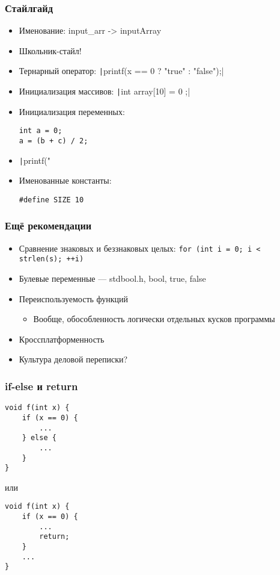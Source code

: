\documentclass{../../slides-style}
\begin{document}
    
    \begin{frame}[plain]
        \titlepage
    \end{frame}
    
    \begin{frame}[fragile]
        \frametitle{Стайлгайд}
        \begin{itemize}
            \item Именование: input\_arr -> inputArray
            \item Школьник-стайл!
            \item Тернарный оператор: \texttt|printf(x == 0 ? "true" :  "false");|
            \item Инициализация массивов: \texttt|int array[10] = { 0 };|
            \item Инициализация переменных:
                \begin{verbatim}
int a = 0;
a = (b + c) / 2;
                \end{verbatim}
            \item \texttt|printf("%
            \item Именованные константы: 
                \begin{verbatim}
#define SIZE 10
                \end{verbatim}
        \end{itemize}
    \end{frame}

    \begin{frame}[fragile]
        \frametitle{Ещё рекомендации}
        \begin{itemize}
            \item Сравнение знаковых и беззнаковых целых: \texttt{for (int i = 0; i < strlen(s); ++i)}
            \item Булевые переменные --- stdbool.h, bool, true, false
            \item Переиспользуемость функций
            \begin{itemize}
                \item Вообще, обособленность логически отдельных кусков программы
            \end{itemize}
            \item Кроссплатформенность
            \item Культура деловой переписки?
        \end{itemize}
    \end{frame}

    \begin{frame}[fragile]
        \frametitle{if-else и return}
        \begin{verbatim}
void f(int x) {
    if (x == 0) {
        ...
    } else {
        ...
    }
}
        \end{verbatim}
        или
        \begin{verbatim}
void f(int x) {
    if (x == 0) {
        ...
        return;
    } 
    ...
}
        \end{verbatim}
    \end{frame}
\end{document}
